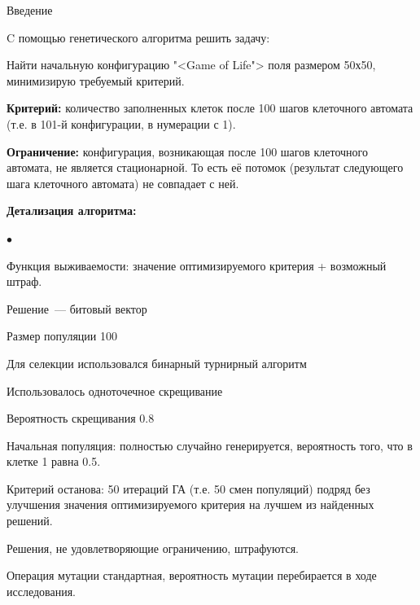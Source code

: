 \documentclass[a4paper,12pt,titlepage,final]{article}
\newenvironment{compactlist}{     %
\begin{list}{{$\bullet$}}{
\setlength\partopsep{0pt}
\setlength\parskip{0pt}
\setlength\parsep{0pt}
\setlength\topsep{0pt}
\setlength\itemsep{0pt}
}
}{
\end{list}
}
\begin{document}
\begin{section}{Введение}

    C помощью генетического алгоритма решить задачу:

    Найти начальную конфигурацию "<Game of Life"> поля размером 50х50, минимизирую требуемый критерий.

    \textbf{Критерий:} количество заполненных клеток после 100 шагов клеточного автомата (т.е. в 101-й конфигурации, в нумерации с 1).
    
    \textbf{Ограничение:} конфигурация, возникающая после 100 шагов клеточного автомата, не является стационарной. То есть её потомок (результат следующего шага клеточного автомата) не совпадает с ней.

    \textbf{Детализация алгоритма:}
    \begin{compactlist}
        \item Функция выживаемости: значение оптимизируемого критерия + возможный штраф.
        \item Решение~--- битовый вектор
        \item Размер популяции 100
        \item Для селекции использовался бинарный турнирный алгоритм
        \item Использовалось одноточечное скрещивание
        \item Вероятность скрещивания 0.8
        \item Начальная популяция: полностью случайно генерируется, вероятность того, что в клетке 1 равна 0.5.
        \item Критерий останова: 50 итераций ГА (т.е. 50 смен популяций) подряд без улучшения значения оптимизируемого критерия на лучшем из найденных решений.
        \item Решения, не удовлетворяющие ограничению, штрафуются.
        \item Операция мутации стандартная, вероятность мутации перебирается в ходе исследования.
    \end{compactlist}

\end{section}
\end{document}
